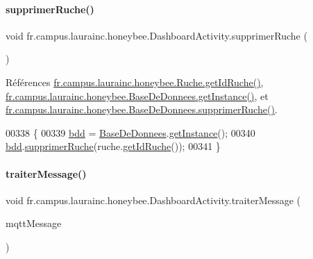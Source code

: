 \paragraph{\texorpdfstring{supprimer\+Ruche()}{supprimerRuche()}}
{\footnotesize\ttfamily void fr.\+campus.\+laurainc.\+honeybee.\+Dashboard\+Activity.\+supprimer\+Ruche (\begin{DoxyParamCaption}{ }\end{DoxyParamCaption})\hspace{0.3cm}{\ttfamily [private]}}



Références \hyperlink{classfr_1_1campus_1_1laurainc_1_1honeybee_1_1_ruche_ace3993bb5f36dc8c63f18bcc3ac75adf}{fr.\+campus.\+laurainc.\+honeybee.\+Ruche.\+get\+Id\+Ruche()}, \hyperlink{classfr_1_1campus_1_1laurainc_1_1honeybee_1_1_base_de_donnees_a9c2484cfb87f90e46cf878eb7803abb2}{fr.\+campus.\+laurainc.\+honeybee.\+Base\+De\+Donnees.\+get\+Instance()}, et \hyperlink{classfr_1_1campus_1_1laurainc_1_1honeybee_1_1_base_de_donnees_a7b0977566d74684fab184f7a5efce3c8}{fr.\+campus.\+laurainc.\+honeybee.\+Base\+De\+Donnees.\+supprimer\+Ruche()}.


\begin{DoxyCode}
00338     \{
00339         \hyperlink{classfr_1_1campus_1_1laurainc_1_1honeybee_1_1_dashboard_activity_ac091db6a886cd65c54b8596c95b87d37}{bdd} = \hyperlink{class_base_de_donnees}{BaseDeDonnees}.\hyperlink{class_base_de_donnees_a80028aa2b6b4fbf30fb2e36357b7d3d3}{getInstance}();
00340         \hyperlink{classfr_1_1campus_1_1laurainc_1_1honeybee_1_1_dashboard_activity_ac091db6a886cd65c54b8596c95b87d37}{bdd}.\hyperlink{classfr_1_1campus_1_1laurainc_1_1honeybee_1_1_base_de_donnees_a7b0977566d74684fab184f7a5efce3c8}{supprimerRuche}(ruche.\hyperlink{classfr_1_1campus_1_1laurainc_1_1honeybee_1_1_ruche_ace3993bb5f36dc8c63f18bcc3ac75adf}{getIdRuche}());
00341     \}
\end{DoxyCode}
\mbox{\label{classfr_1_1campus_1_1laurainc_1_1honeybee_1_1_dashboard_activity_a50d4c14e993ff1779ae5dce8cee11216}} 
\paragraph{\texorpdfstring{traiter\+Message()}{traiterMessage()}}
{\footnotesize\ttfamily void fr.\+campus.\+laurainc.\+honeybee.\+Dashboard\+Activity.\+traiter\+Message (\begin{DoxyParamCaption}\item[{Mqtt\+Message}]{mqtt\+Message }\end{DoxyParamCaption})\hspace{0.3cm}{\ttfamily [private]}}



